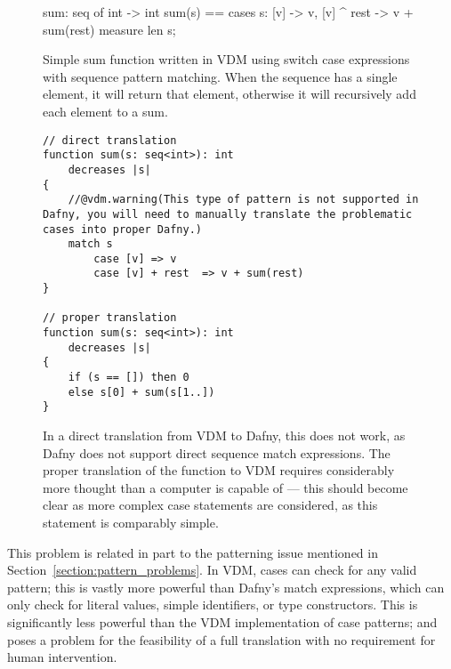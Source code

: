 \documentclass{entcs}
\newcommand{\lfcomment}[1]{\ifthenelse { \boolean{showComments} } {\textcolor{red}{LF:~#1}} { } } %
\begin{document}
\begin{figure}[h]
	\begin{center}
        \begin{vdmsl}
sum: seq of int -> int
sum(s) == 
cases s:
    [v] -> v,
    [v] ^ rest -> v + sum(rest)
measure len s;
        \end{vdmsl}
		\caption{Simple sum function written in VDM using switch case expressions with sequence pattern matching. When the sequence has a single element, it will return that element, otherwise it will recursively add each element to a sum.}\label{fig:vdm_case_patterns}
	\end{center}
\end{figure}

\begin{figure}[h]
	\begin{center}
        \begin{lstlisting}
// direct translation
function sum(s: seq<int>): int 
    decreases |s|
{
    //@vdm.warning(This type of pattern is not supported in Dafny, you will need to manually translate the problematic cases into proper Dafny.)
    match s
        case [v] => v
        case [v] + rest  => v + sum(rest)
}

// proper translation
function sum(s: seq<int>): int 
    decreases |s|
{
    if (s == []) then 0
    else s[0] + sum(s[1..])
}
        \end{lstlisting}
		\caption{In a direct translation from VDM to Dafny, this does not work, as Dafny does not support direct sequence match expressions. The proper translation of the function to VDM requires considerably more thought than a computer is capable of --- this should become clear as more complex case statements are considered, as this statement is comparably simple.}\label{fig:dafny_bad_cases}
	\end{center}
\end{figure}

This problem is related in part to the patterning issue mentioned in Section~\ref{section:pattern_problems}. In VDM, cases can check for any valid pattern; this is vastly more powerful than Dafny's match expressions, which can only check for literal values, simple identifiers, or type constructors. This is significantly less powerful than the VDM implementation of case patterns; and poses a problem for the feasibility of a full translation with no requirement for human intervention. 
\end{document}
